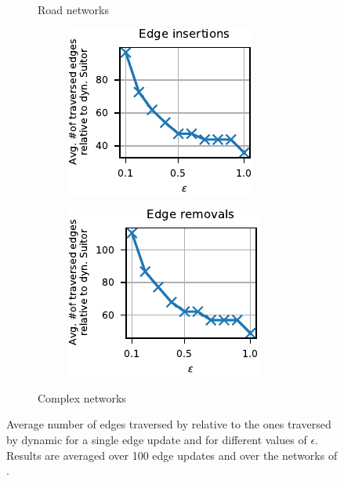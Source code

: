 \begin{figure}[t]
\begin{subfigure}[b]{.5\textwidth}
\begin{subfigure}[b]{.5\textwidth}
\end{subfigure}
\caption{Road networks}
\label{fig:dyn-mwm:rw-vedges-road}
\end{subfigure}\hfill
\begin{subfigure}[b]{.5\textwidth}
\begin{subfigure}[b]{.5\textwidth}
\centering
\includegraphics[width=.9\textwidth]{sources/plots/dyn-mwm/rw-insertion-cplx-vedges.pdf}
\end{subfigure}\hfill
\begin{subfigure}[b]{.5\textwidth}
\centering
\includegraphics[width=.9\textwidth]{sources/plots/dyn-mwm/rw-removal-cplx-vedges.pdf}
\end{subfigure}
\caption{Complex networks}
\label{fig:dyn-mwm:rw-vedges-cplx}
\end{subfigure}
\caption{Average number of edges traversed by \dynmwmrandom relative to the ones traversed
by dynamic \suitor for a single edge update and for different values of $\epsilon$.
Results are averaged over 100 edge updates and over the networks of
.}
\label{fig:dyn-mwm:rw-vedges-real-world}
\end{figure}

